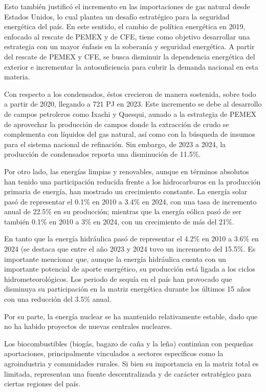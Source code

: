 \documentclass{sener2025}
\begin{document}
Esto también justificó el incremento en las importaciones de gas natural desde Estados Unidos, lo cual plantea un desafío estratégico para la seguridad energética del país. En este sentido, el cambio de política energética en 2019, enfocado al rescate de PEMEX y de CFE, tiene como objetivo desarrollar una estrategia con un mayor énfasis en la soberanía y seguridad energética. A partir del rescate de PEMEX y CFE, se busca disminuir la dependencia energética del exterior e incrementar la autosuficiencia para cubrir la demanda nacional en esta materia.

Con respecto a los condensados, éstos crecieron de manera sostenida, sobre todo a partir de 2020, llegando a 721 PJ en 2023. Este incremento se debe al desarrollo de campos petroleros como Ixachi y Quesqui, aunado a la estrategia de PEMEX de aprovechar la producción de campos donde la extracción de crudo se complementa con líquidos del gas natural, así como con la búsqueda de insumos para el sistema nacional de refinación. Sin embargo, de 2023 a 2024, la producción de condensados reporta una disminución de 11.5\%.

Por otro lado, las energías limpias y renovables, aunque en términos absolutos han tenido una participación reducida frente a los hidrocarburos en la producción primaria de energía, han mostrado un crecimiento constante. La energía solar pasó de representar el 0.1\% en 2010 a 3.4\% en 2024, con una tasa de incremento anual de 22.5\% en su producción; mientras que la energía eólica pasó de ser también 0.1\% en 2010 a 3\% en 2024, con un crecimiento de más del 21\%.

En tanto que la energía hidráulica pasó de representar el 4.2\% en 2010 a 3.6\% en 2024 (se destaca que entre el año 2023 y 2024 tuvo un incremento del 15.5\%. Es importante mencionar que, aunque la energía hidráulica cuenta con un importante potencial de aporte energético, su producción está ligada a los ciclos hidrometeorológicos. Los periodo de sequía en el país han provocado que disminuya su participación en la matriz energética durante los últimos 15 años con una reducción del 3.5\% anual.

Por su parte, la energía nuclear se ha mantenido relativamente estable, dado que no ha habido proyectos de nuevas centrales nucleares.

Los biocombustibles (biogás, bagazo de caña y la leña) continúan con pequeñas aportaciones, principalmente vinculados a sectores específicos como la agroindustria y comunidades rurales. Si bien su importancia en la matriz total es limitada, representan una fuente descentralizada y de carácter estratégico para ciertas regiones del país.
\end{document}
